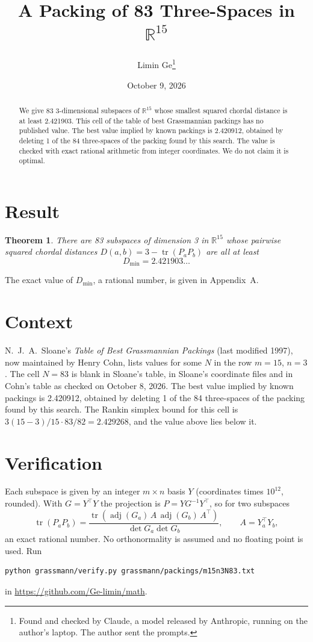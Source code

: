 \documentclass[11pt,a4paper]{article}
\title{A Packing of 83 Three-Spaces in $\mathbb{R}^{15}$}
\author{Limin Ge\thanks{Found and checked by Claude, a model released by Anthropic, running on the author's laptop. The author sent the prompts.}}
\date{October 9, 2026}
\newtheorem*{theorem}{Theorem}
\begin{document}
\maketitle
\begin{abstract}
We give 83 3-dimensional subspaces of $\mathbb{R}^{15}$ whose smallest squared chordal distance is at least 2.421903. This cell of the table of best Grassmannian packings has no published value. The best value implied by known packings is 2.420912, obtained by deleting 1 of the 84 three-spaces of the packing found by this search. The value is checked with exact rational arithmetic from integer coordinates. We do not claim it is optimal.
\end{abstract}

\section{Result}
\begin{theorem}
There are 83 subspaces of dimension 3 in $\mathbb{R}^{15}$ whose pairwise squared chordal distances $D(a,b) = 3 - \operatorname{tr}(P_aP_b)$ are all at least
\[ D_{\min} = 2.421903\ldots \]
\end{theorem}
The exact value of $D_{\min}$, a rational number, is given in Appendix~A.


\section{Context}
N.~J.~A.~Sloane's \emph{Table of Best Grassmannian Packings} (last modified 1997), now maintained by Henry Cohn, lists values for some $N$ in the row $m=15$, $n=3$. The cell $N=83$ is blank in Sloane's table, in Sloane's coordinate files and in Cohn's table as checked on October 8, 2026. The best value implied by known packings is 2.420912, obtained by deleting 1 of the 84 three-spaces of the packing found by this search. The Rankin simplex bound for this cell is $3(15-3)/15\cdot 83/82 = 2.429268$, and the value above lies below it.


\section{Verification}
Each subspace is given by an integer $m\times n$ basis $Y$ (coordinates times $10^{12}$, rounded). With $G=Y^\top Y$ the projection is $P=YG^{-1}Y^\top$, so for two subspaces
\[ \operatorname{tr}(P_aP_b)=\frac{\operatorname{tr}(\operatorname{adj}(G_a)\,A\,\operatorname{adj}(G_b)\,A^\top)}{\det G_a\det G_b},\qquad A=Y_a^\top Y_b, \]
an exact rational number. No orthonormality is assumed and no floating point is used. Run
\begin{verbatim}
python grassmann/verify.py grassmann/packings/m15n3N83.txt
\end{verbatim}
in \url{https://github.com/Ge-limin/math}.
\end{document}
